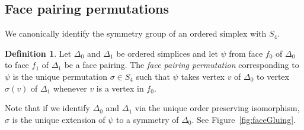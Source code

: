 \documentclass[12pt]{amsart}
\theoremstyle{definition}
\newtheorem{definition}[theorem]{Definition}
\numberwithin{equation}{section}
\begin{document}


\subsection{Face pairing permutations}
We canonically identify the symmetry group of an ordered simplex with
$S_4$.
\begin{definition} 
Let $\Delta_0$ and $\Delta_1$ be ordered simplices and let $\psi$ from face $f_0$ of $\Delta_0$ to face $f_1$ of $\Delta_1$ be a face pairing. The \emph{face pairing permutation} corresponding to $\psi$ is the unique permutation $\sigma\in S_4$ such that $\psi$ takes vertex $v$ of $\Delta_0$ to vertex $\sigma(v)$ of $\Delta_1$ whenever $v$ is a vertex in $f_0$. %
\end{definition}
Note that if we identify $\Delta_0$ and $\Delta_1$ via the unique order preserving isomorphism, $\sigma$ is the unique extension of $\psi$ to a symmetry of $\Delta_0$. See Figure~\ref{fig:faceGluing}.







\end{document}
